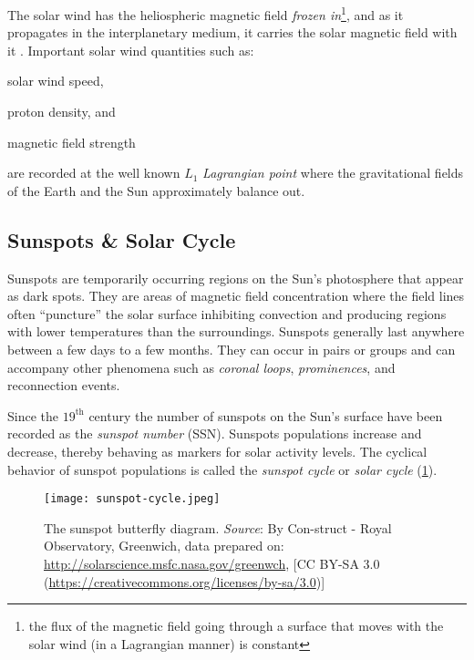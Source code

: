 The solar wind has the heliospheric magnetic field \emph{frozen in}\footnote{the flux of the 
magnetic field going through a surface that moves with the solar wind (in a Lagrangian manner) is 
constant}, and as it propagates in the interplanetary medium, it carries the solar magnetic field 
with it \citep{alfven1942existence,alfven1943existence}. Important solar wind quantities such as: 
%
\begin{enumerate*} 
    \item solar wind speed, 
    \item proton density, and  
    \item magnetic field strength 
\end{enumerate*}
% 
are recorded at the well known $L_1$ \emph{Lagrangian point} where the gravitational fields of the 
Earth and the Sun approximately balance out.



\subsection{Sunspots \& Solar Cycle}\label{sec:sunspots}

Sunspots are temporarily occurring regions on the Sun's photosphere that appear as dark spots. 
They are areas of magnetic field concentration where the field lines often \enquote{puncture} the 
solar surface inhibiting convection and producing regions with lower temperatures than the 
surroundings. Sunspots generally last anywhere between a few days to a few months. They can occur 
in pairs or groups and can accompany other phenomena such as \emph{coronal loops}, 
\emph{prominences}, and reconnection events.

Since the $19^{\text{th}}$ century the number of sunspots on the Sun's surface have been recorded 
as the \emph{sunspot number} (SSN). Sunspots populations increase and decrease, thereby behaving as 
markers for solar activity levels. The cyclical behavior of sunspot populations is called the 
\emph{sunspot cycle} or \emph{solar cycle} (\cref{fig:SolarCycle}). 

\begin{figure}
    \noindent\texttt{[image: sunspot-cycle.jpeg]}
    \caption{{\small The sunspot butterfly diagram.
    \textit{Source}: By Con-struct - Royal Observatory, Greenwich,
    data prepared on: \url{http://solarscience.msfc.nasa.gov/greenwch}, 
    [CC BY-SA 3.0 (\url{https://creativecommons.org/licenses/by-sa/3.0})]
    }}
    \label{fig:SolarCycle}
\end{figure}

